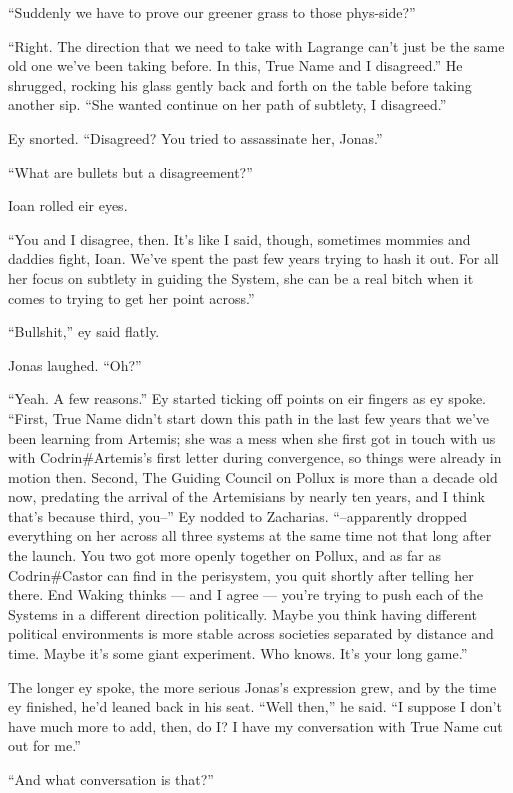 ``Suddenly we have to prove our greener grass to those phys-side?''

``Right. The direction that we need to take with Lagrange can't just be the same old one we've been taking before. In this, True Name and I disagreed.'' He shrugged, rocking his glass gently back and forth on the table before taking another sip. ``She wanted continue on her path of subtlety, I disagreed.''

Ey snorted. ``Disagreed? You tried to assassinate her, Jonas.''

``What are bullets but a disagreement?''

Ioan rolled eir eyes.

``You and I disagree, then. It's like I said, though, sometimes mommies and daddies fight, Ioan. We've spent the past few years trying to hash it out. For all her focus on subtlety in guiding the System, she can be a real bitch when it comes to trying to get her point across.''

``Bullshit,'' ey said flatly.

Jonas laughed. ``Oh?''

``Yeah. A few reasons.'' Ey started ticking off points on eir fingers as ey spoke. ``First, True Name didn't start down this path in the last few years that we've been learning from Artemis; she was a mess when she first got in touch with us with Codrin\#Artemis's first letter during convergence, so things were already in motion then. Second, The Guiding Council on Pollux is more than a decade old now, predating the arrival of the Artemisians by nearly ten years, and I think that's because third, you--'' Ey nodded to Zacharias. ``--apparently dropped everything on her across all three systems at the same time not that long after the launch. You two got more openly together on Pollux, and as far as Codrin\#Castor can find in the perisystem, you quit shortly after telling her there. End Waking thinks — and I agree — you're trying to push each of the Systems in a different direction politically. Maybe you think having different political environments is more stable across societies separated by distance and time. Maybe it's some giant experiment. Who knows. It's your long game.''

The longer ey spoke, the more serious Jonas's expression grew, and by the time ey finished, he'd leaned back in his seat. ``Well then,'' he said. ``I suppose I don't have much more to add, then, do I? I have my conversation with True Name cut out for me.''

``And what conversation is that?''

